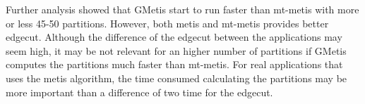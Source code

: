 \documentclass[abstract=on,9pt,twocolumn]{scrartcl}
\begin{document}
Further analysis showed that GMetis start to run faster than mt-metis
with more or less 45-50 partitions. However, both metis and mt-metis provides
better edgecut.
Although the difference of the edgecut between the applications may seem
high, it may be not relevant for an higher number of partitions if
GMetis computes the partitions much faster than mt-metis. For real
applications that uses the metis algorithm, the time consumed
calculating the partitions may be more important than a difference of
two time for the edgecut.




\end{document}
